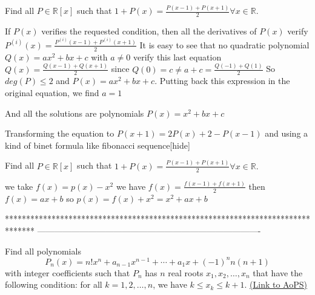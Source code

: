 \begin{solution}
	\begin{tcolorbox}Find all $ P\in\mathbb{R}[x]$ such that $ 1+P(x)=\frac{P(x-1)+P(x+1)}{2}\forall x\in\mathbb R.$\end{tcolorbox}

If $ P(x)$ verifies the requested condition, then all the derivatives of $ P(x)$ verify $ P^{(i)}(x)=\frac{P^{(i)}(x-1)+P^{(i)}(x+1)}{2}$
It is easy to see that no quadratic polynomial $ Q(x)=ax^{2}+bx+c$ with $ a\neq 0$ verify this last equation  $ Q(x)=\frac{Q(x-1)+Q(x+1)}{2}$ since $ Q(0)=c\neq a+c=\frac{Q(-1)+Q(1)}{2}$
So $ deg(P)\leq 2$ and $ P(x)=ax^{2}+bx+c$. Putting back this expression in the original equation, we find $ a=1$

And all the solutions are polynomials $ P(x)=x^{2}+bx+c$
\end{solution}



\begin{solution}Transforming the equation to $ P(x+1)=2P(x)+2-P(x-1)$ and using a kind of binet formula like fibonacci sequence[\/hide]
\end{solution}



\begin{solution}
	\begin{tcolorbox}Find all $ P\in\mathbb{R}[x]$ such that $ 1+P(x)=\frac{P(x-1)+P(x+1)}{2}\forall x\in\mathbb R.$\end{tcolorbox}
we take $ f(x)=p(x)-x^{2}$
we have $ f(x)=\frac{f(x-1)+f(x+1)}{2}$ then $ f(x)=ax+b$
so $ p(x)=f(x)+x^{2}=x^{2}+ax+b$
\end{solution}
*******************************************************************************
-------------------------------------------------------------------------------

\begin{problem}
	Find all polynomials
\[P_{n}(x)=n!x^{n}+a_{n-1}x^{n-1}+\cdots+a_{1}x+(-1)^{n}n(n+1)\]
with integer coefficients such that $P_n$ has $ n$ real roots $ x_{1},x_{2},\ldots,x_{n}$ that have the following condition: for all $ k=1,2,\ldots,n$, we have $ k\leq x_{k}\leq k+1$.
	\flushright \href{https://artofproblemsolving.com/community/c6h162115}{(Link to AoPS)}
\end{problem}



